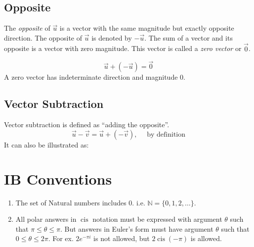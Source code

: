 \documentclass{article}
\DeclareMathOperator\cis{cis}
\numberwithin{equation}{section}
\begin{document}
\subsection{Opposite}
The \emph{opposite} of $\vec u$ is a vector with the same magnitude but exactly opposite direction. The opposite of $\vec u$ is denoted by $- \vec u$. The sum of a vector and its opposite is a vector with zero magnitude. This vector is called a \emph{zero vector} or $\vec 0$.

\begin{equation}
	\vec u + ( - \vec u ) = \vec 0
\end{equation}
A zero vector has indeterminate direction and magnitude 0.

\subsection{Vector Subtraction}
Vector subtraction is defined as ``adding the opposite''.
\begin{equation}
	\vec u - \vec v = \vec u + ( - \vec v), \quad \textrm{ by definition}
\end{equation}
It can also be illustrated as:


\section{IB Conventions}
\begin{enumerate}
	\item The set of Natural numbers includes 0. i.e. $\mathbb{N} = \{0,1,2,\dots\}$.
	\item All polar answers in $\cis$ notation must be expressed with argument $\theta$ such that $\pi\le\theta\le\pi$. But answers in Euler's form must have argument $\theta$ such that $0 \le \theta \le 2 \pi$. For ex. $2e^{-\pi i}$ is not allowed, but $2\cis(-\pi)$ is allowed.
\end{enumerate}
\end{document}
